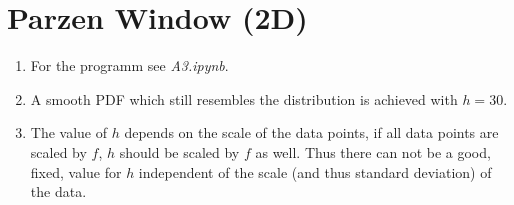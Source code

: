 \documentclass[DIN, pagenumber=false, fontsize=11pt, parskip=half]{scrartcl}
\begin{document}
    \section{Parzen Window (2D)}
    \begin{enumerate}
        \item For the programm see \textit{A3.ipynb}.
            \addtocounter{enumi}{3}
        \item A smooth PDF which still resembles the distribution is achieved with $h=30$.
        \item The value of $h$ depends on the scale of the data points, if all data points are scaled by $f$, $h$ should be scaled by $f$ as well. Thus there can not be a good, fixed, value for $h$ independent of the scale (and thus standard deviation) of the data. 
    \end{enumerate}
\end{document}
